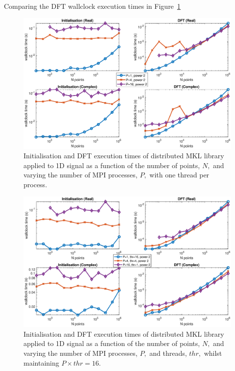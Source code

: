 \documentclass[a4paper]{article}
\begin{document}
Comparing the DFT wallclock execution times in Figure~\ref{1DDistMKL}



\begin{figure}[htb]
    \centering
    \includegraphics[width=0.9\linewidth]{../results/mkl_1d_mpi.eps}
  \caption{Initialisation and DFT execution times of distributed MKL library applied to 1D signal as a function of the
    number of points, $N,$ and varying the number of MPI processes, $P,$ with one thread per process.}
  \label{1DDistMKL}
\end{figure}

\begin{figure}[htb]
    \centering
    \includegraphics[width=0.9\linewidth]{../results/mkl_1d_mpi_thr.eps}
  \caption{Initialisation and DFT execution times of distributed MKL library applied to 1D signal as a function of the
    number of points, $N,$ and varying the number of MPI processes, $P,$ and threads, $thr,$ whilst maintaining $P\times thr=16.$}
  \label{1DDistMKL16}
\end{figure}
\end{document}
